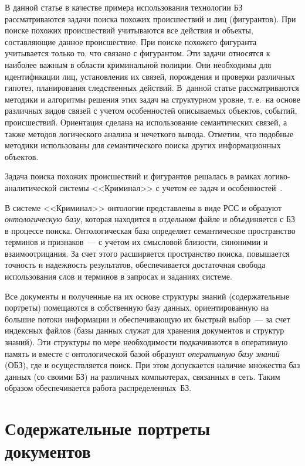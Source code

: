\begin{multicols}{2}
    В данной статье в качестве примера использования технологии БЗ 
рассматриваются задачи поиска похожих происшествий и лиц (фигурантов). 
При поиске похожих происшествий учитываются все действия и объекты, 
составляющие данное происшествие. При поиске похожего фигуранта 
учитывается только то, что связано с фигурантом. Эти задачи относятся к 
наиболее важным в об\-ласти криминальной полиции. Они необходимы для 
идентификации лиц, установления их связей, порождения и проверки 
различных гипотез, планирования следственных действий. В~данной статье 
рассматриваются методики и алгоритмы решения этих задач на структурном 
уровне, т.\,е.\ на основе различных видов связей с учетом особенностей 
описываемых объектов, событий, происшествий. Ориентация сделана на 
использование семантических связей, а также методов логического анализа и 
нечеткого вывода. Отметим, что подобные методики использованы для 
семантического поиска других информационных объектов.
    
    Задача поиска похожих происшествий и фигурантов решалась в рамках 
логико-аналитической системы <<Криминал>> с учетом ее задач и 
особенностей~\cite{3sha, 8sha}.
    
    В системе <<Криминал>> онтологии представлены в виде РСС и образуют 
\textit{онтологическую базу}, которая находится в отдельном файле и 
объединяется с БЗ в процессе поиска. Онтологическая база определяет 
семантическое пространство терминов и признаков~--- с учетом их смысловой 
близости, синонимии и взаимоотрицания. За счет этого расширяется 
пространство поиска, повышается точность и надежность результатов, 
обеспечивается достаточная свобода использования слов и терминов в запросах 
и заданиях системе.
    
    Все документы и полученные на их основе структуры знаний 
(содержательные портреты) помещаются в собственную базу данных, 
ориентированную на большие потоки информации и обеспечивающую их 
быстрый выбор~--- за счет индексных файлов (базы данных служат для 
хранения документов и структур знаний). Эти структуры по мере 
необходимости подкачиваются в оперативную память и вместе с 
онтологической базой образуют \textit{оперативную базу знаний} (ОБЗ), где и 
осуществляется поиск. При этом допускается наличие множества баз данных 
(со своими БЗ) на различных компьютерах, связанных в сеть. Таким образом 
обеспечивается работа распределенных~БЗ.

\vspace*{-6pt}
    
\section{Содержательные портреты документов}


\end{multicols}

